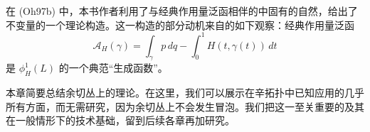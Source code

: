 在 (Oh97b) 中，本书作者利用了与经典作用量泛函相伴的\termFloerComplex{}中固有的自然\termFiltration{}，给出了\personViterbo{}不变量的一个\personFloer{}理论构造。这一构造的部分动机来自\personWeinstein{}的如下观察：经典作用量泛函
\[
  \mathcal A_H(\gamma)
  =\int_\gamma p\,dq-\int_0^1 H(t,\gamma(t))\,dt
\]
是\termLagrangianSubmanifold{} $\phi_H^1(L)$ 的一个典范“生成函数”。

本章简要总结余切丛上的\personFloer{}理论。在这里，我们可以展示\termFloerHomology{}在辛拓扑中已知应用的几乎所有方面，而无需研究\termBubblingPhenomenon{}，因为余切丛上不会发生冒泡。我们把这一至关重要的\termBubblingPhenomenon{}及其在一般情形下的技术基础，留到后续各章再加研究。









